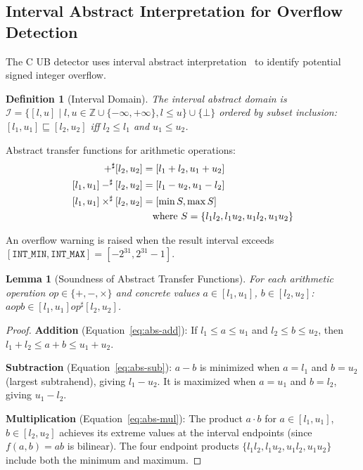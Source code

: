 \documentclass[11pt,a4paper]{article}
\newtheorem{lemma}[theorem]{Lemma}
\newtheorem{definition}[theorem]{Definition}
\begin{document}
\begin{appendices}
\section{Interval Abstract Interpretation for Overflow Detection}\label{app:abstract-interp}

The C UB detector uses interval abstract
interpretation~\cite{cousot1977abstract} to identify potential signed
integer overflow.

\begin{definition}[Interval Domain]
The interval abstract domain is $\mathcal{I} = \{[l, u] \mid l, u \in
\mathbb{Z} \cup \{-\infty, +\infty\}, l \leq u\} \cup \{\bot\}$
ordered by subset inclusion: $[l_1, u_1] \sqsubseteq [l_2, u_2]$ iff
$l_2 \leq l_1$ and $u_1 \leq u_2$.
\end{definition}

Abstract transfer functions for arithmetic operations:
\begin{align}
  [l_1, u_1] +^{\sharp} [l_2, u_2] &= [l_1 + l_2, u_1 + u_2] \label{eq:abs-add}\\
  [l_1, u_1] -^{\sharp} [l_2, u_2] &= [l_1 - u_2, u_1 - l_2] \label{eq:abs-sub}\\
  [l_1, u_1] \times^{\sharp} [l_2, u_2] &= [\min S, \max S] \label{eq:abs-mul}\\
  &\quad \text{where } S = \{l_1 l_2, l_1 u_2, u_1 l_2, u_1 u_2\} \notag
\end{align}

An overflow warning is raised when the result interval exceeds
$[\texttt{INT\_MIN}, \texttt{INT\_MAX}] = [-2^{31}, 2^{31}-1]$.

\begin{lemma}[Soundness of Abstract Transfer Functions]\label{lem:abs-sound}
For each arithmetic operation $op \in \{+, -, \times\}$ and concrete
values $a \in [l_1, u_1]$, $b \in [l_2, u_2]$:
$a \mathbin{op} b \in [l_1, u_1] \mathbin{op}^{\sharp} [l_2, u_2]$.
\end{lemma}

\begin{proof}
\textbf{Addition} (Equation~\ref{eq:abs-add}):
If $l_1 \leq a \leq u_1$ and $l_2 \leq b \leq u_2$, then
$l_1 + l_2 \leq a + b \leq u_1 + u_2$.

\textbf{Subtraction} (Equation~\ref{eq:abs-sub}):
$a - b$ is minimized when $a = l_1$ and $b = u_2$ (largest subtrahend),
giving $l_1 - u_2$.  It is maximized when $a = u_1$ and $b = l_2$,
giving $u_1 - l_2$.

\textbf{Multiplication} (Equation~\ref{eq:abs-mul}):
The product $a \cdot b$ for $a \in [l_1, u_1]$, $b \in [l_2, u_2]$ achieves
its extreme values at the interval endpoints (since $f(a,b) = ab$ is
bilinear).  The four endpoint products $\{l_1 l_2, l_1 u_2, u_1 l_2, u_1 u_2\}$
include both the minimum and maximum.
\end{proof}


\end{appendices}
\end{document}
